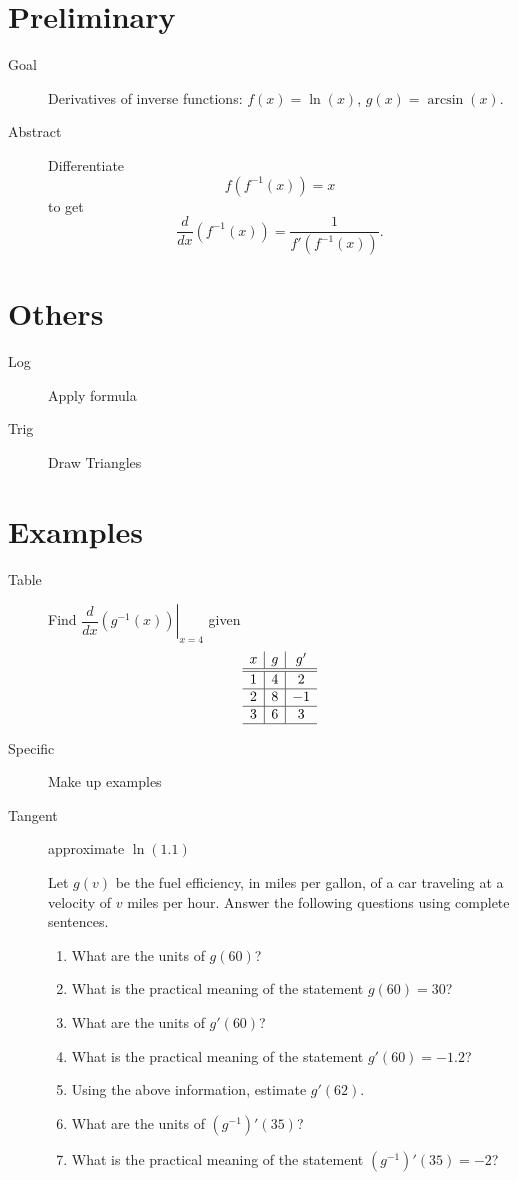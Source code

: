 \documentclass[11pt]{article}
\begin{document}
\drawtitle

\section*{Preliminary}
\begin{description}
\item[Goal] Derivatives of inverse functions: $f(x)=\ln(x)$,
  $g(x)=\arcsin(x)$.
\item[Abstract] Differentiate
  \[
  f(f^{-1}(x))=x
  \]
  to get
  \[
  \frac{d}{dx}(f^{-1}(x))=\frac{1}{f'(f^{-1}(x))}.
  \]
\end{description}

\section*{Others}
\begin{description}
\item[Log] Apply formula
\item[Trig] Draw Triangles
\end{description}

\section*{Examples}
\begin{description}
\item[Table] Find $\left.\dfrac{d}{dx}(g^{-1}(x))\right|_{x=4}$ given
  \[
  \begin{array}{c|c|c}
    x & g & g' \\
    \hline
    \hline
    1 & 4 &  2 \\
    \hline
    2 & 8 & -1 \\
    \hline
    3 & 6 &  3 \\
    \hline
  \end{array}
  \]
\item[Specific] Make up examples
\item[Tangent] approximate $\ln(1.1)$

Let $g(v)$ be the fuel efficiency, in miles per gallon, of a car traveling at a velocity of $v$ miles per hour. Answer the following questions using complete sentences.
\begin{enumerate}
  \item What are the units of $g(60)$?
  \item What is the practical meaning of the statement $g(60) = 30$?
  \item What are the units of $g'(60)$?
  \item What is the practical meaning of the statement $g'(60) = -1.2$?
  \item Using the above information, estimate $g'(62)$.
  \item What are the units of $\left(g^{-1}\right)'(35)$?
  \item What is the practical meaning of the statement $\left(g^{-1}\right)'(35) = -2$?
\end{enumerate}

\end{description}
\end{document}
